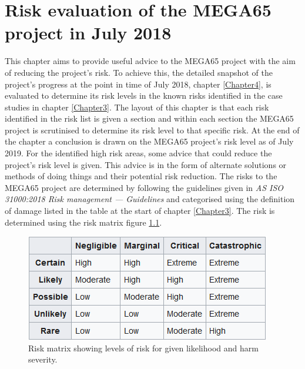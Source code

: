 
\chapter{Risk evaluation of the MEGA65 project in July 2018}
\label{Chapter5}
This chapter aims to provide useful advice to the MEGA65 project with the aim of reducing the project's risk. To achieve this, the detailed snapshot of the project's progress at the point in time of July 2018, chapter \ref{Chapter4}, is evaluated to determine its risk levels in the known risks identified in the case studies in chapter \ref{Chapter3}. The layout of this chapter is that each risk identified in the risk list is given a section and within each section the MEGA65 project is scrutinised to determine its risk level to that specific risk. At the end of the chapter a conclusion is drawn on the MEGA65 project's risk level as of July 2019. For the identified high risk areas, some advice that could reduce the project's risk level is given. This advice is in the form of alternate solutions or methods of doing things and their potential risk reduction. The risks to the MEGA65 project are determined by following the guidelines given in \textit{AS ISO 31000:2018 Risk management — Guidelines} 
\cite{RN164} and categorised using the definition of damage listed in the table at the start of chapter \ref{Chapter3}. The risk is determined using the risk matrix figure \ref{riskmatrix}.

\begin{figure} \begin{center}
\includegraphics[width=.3\linewidth]{pics/riskmatrix} 
\end{center} 
\caption{Risk matrix showing levels of risk for given likelihood and harm severity.\\}
\label{riskmatrix}
\end{figure}

